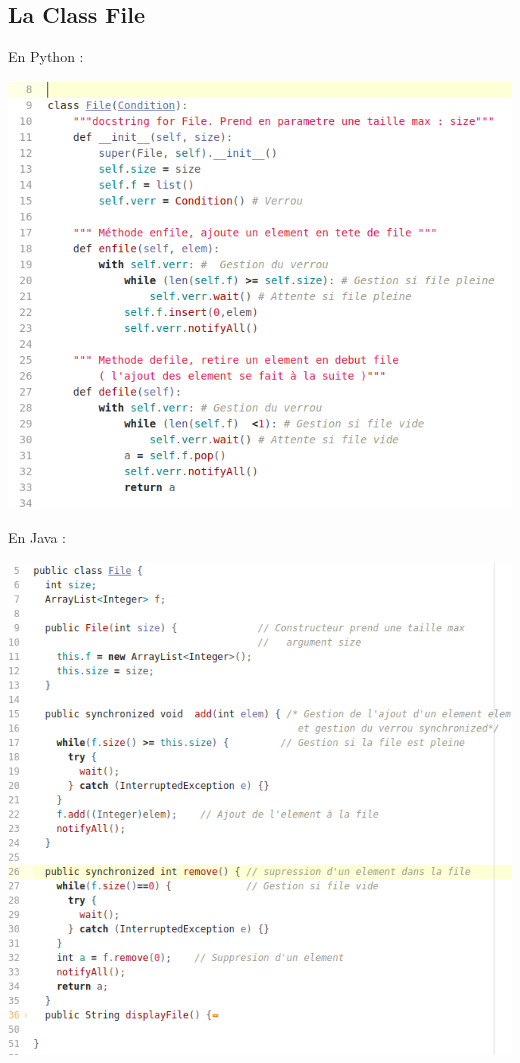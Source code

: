 \documentclass{article}
\begin{document}
\subsection{La Class File}
En Python :
\begin{center}
  \includegraphics[scale=0.6]{FilePy.png}
\end{center}
En Java :
\begin{center}
  \includegraphics[scale=0.6]{Filejava.png}
\end{center}
\end{document}

